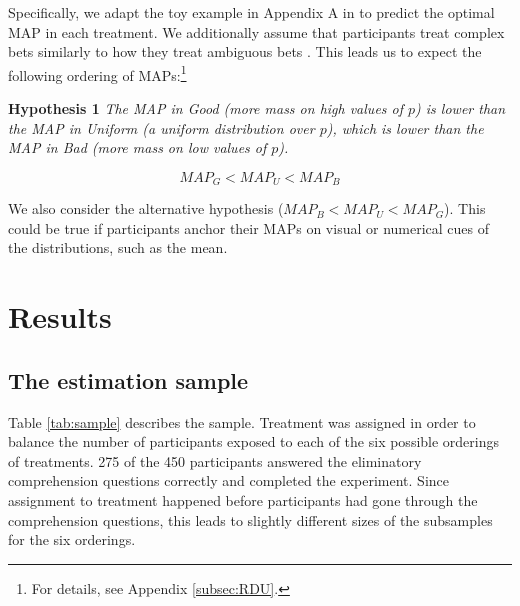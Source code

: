 Specifically, we adapt the toy example in Appendix A in \cite{Li2020a} to predict the optimal MAP in each treatment.
We additionally assume that participants treat complex bets similarly to how they treat ambiguous bets \cite[for supporting evidence, see][]{Armantier2016}.
This leads us to expect the following ordering of MAPs:\footnote{
For details, see Appendix \ref{subsec:RDU}.
}

\noindent \textbf{Hypothesis 1} \quad \textit{The MAP in Good (more mass on high values of $p$) is lower than the MAP in Uniform (a uniform distribution over $p$), which is lower than the MAP in Bad (more mass on low values of $p$).}

\begin{equation}
MAP_G < MAP_U < MAP_B
\end{equation}

We also consider the alternative hypothesis ($MAP_B < MAP_U < MAP_G$).
This could be true if participants anchor their MAPs on visual or numerical cues of the distributions, such as the mean.


\section{Results}\label{sec:results}
\subsection{The estimation sample}\label{ssec:sample}

Table \ref{tab:sample} describes the sample.
Treatment was assigned in order to balance the number of participants exposed to each of the six possible orderings of treatments.
275 of the 450 participants answered the eliminatory comprehension questions correctly and completed the experiment.
Since assignment to treatment happened before participants had gone through the comprehension questions, this leads to slightly different sizes of the subsamples for the six orderings.


